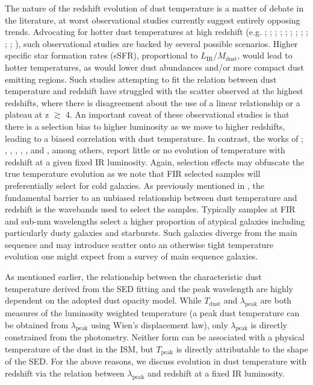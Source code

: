 The nature of the redshift evolution of dust temperature is a matter of debate in the literature, at worst observational studies currently suggest entirely opposing trends. Advocating for hotter dust temperatures at high redshift (e.g. \citealt{Magdis_2012}; \citealt{Magnelli_2014}; \citealt{Swinbank_2014}; \citealt{Bethermin_2015}; \citealt{Faisst_2017}; \citealt{Schreiber_2018}; \citealt{Zavala_2018b}; \citealt{Liang_2019}; \citealt{Ma_2019}; \citealt{Faisst_2020}; \citealt{Bakx_2021}; \citealt{Witstok_2023}), such observational studies are backed by several possible scenarios. Higher specific star formation rates (sSFR), proportional to $L_{\textrm{IR}}/M_{\textrm{dust}}$, would lead to hotter temperatures, as would lower dust abundances and/or more compact dust emitting regions. Such studies attempting to fit the relation between dust temperature and redshift have struggled with the scatter observed at the highest redshifts, where there is disagreement about the use of a linear relationship or a plateau at z $\gtrsim$ 4. An important caveat of these observational studies is that there is a selection bias to higher luminosity as we move to higher redshifts, leading to a biased correlation with dust temperature. In contrast, the works of \citealt{Casey_2018}; \citealt{Jin_2019}, \citealt{Lim_2020a}, \citealt{Dudzeviciute_2020}, \citealt{Reuter_2020}, \citealt{Barger_2022}, \citealt{Drew_2022} and \citealt{Witstok_2023}, among others, report little or no evolution of temperature with redshift at a given fixed IR luminosity. Again, selection effects may obfuscate the true temperature evolution as we note that FIR selected samples will preferentially select for cold galaxies. As previously mentioned in \citealt{Bendo_2023}, the fundamental barrier to an unbiased relationship between dust temperature and redshift is the wavebands used to select the samples. Typically samples at FIR and sub-mm wavelengths select a higher proportion of atypical galaxies including particularly dusty galaxies and starbursts. Such galaxies diverge from the main sequence and may introduce scatter onto an otherwise tight temperature evolution one might expect from a survey of main sequence galaxies.

As mentioned earlier, the relationship between the characteristic dust temperature derived from the SED fitting and the peak wavelength are highly dependent on the adopted dust opacity model. While $T_{\textrm{dust}}$ and $\lambda_{\textrm{peak}}$ are both measures of the luminosity weighted temperature (a peak dust temperature can be obtained from $\lambda_{\textrm{peak}}$ using Wien's displacement law), only $\lambda_{\textrm{peak}}$ is directly constrained from the photometry. Neither form can be associated with a physical temperature of the dust in the ISM, but $T_{\textrm{peak}}$ is directly attributable to the shape of the SED. For the above reasons, we discuss evolution in dust temperature with redshift via the relation between $\lambda_{\textrm{peak}}$ and redshift at a fixed IR luminosity.

